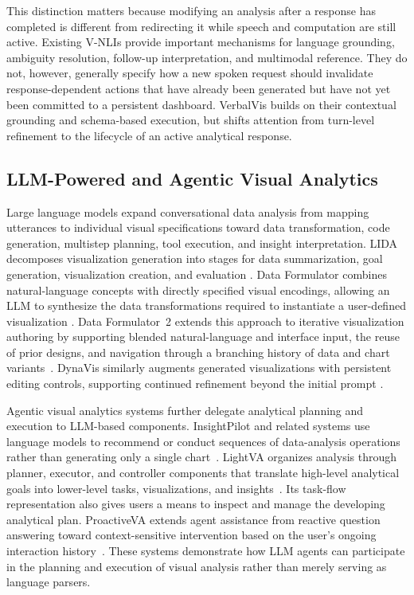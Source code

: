 \documentclass[journal]{IEEEtran}
\begin{document}
This distinction matters because modifying an analysis after a response has
completed is different from redirecting it while speech and computation are
still active. Existing V-NLIs provide important mechanisms for language
grounding, ambiguity resolution, follow-up interpretation, and multimodal
reference. They do not, however, generally specify how a new spoken request
should invalidate response-dependent actions that have already been generated
but have not yet been committed to a persistent dashboard. VerbalVis builds on
their contextual grounding and schema-based execution, but shifts attention
from turn-level refinement to the lifecycle of an active analytical response.

\subsection{LLM-Powered and Agentic Visual Analytics}
\label{sec:rw-agentic}

Large language models expand conversational data analysis from mapping
utterances to individual visual specifications toward data transformation,
code generation, multistep planning, tool execution, and insight
interpretation. LIDA decomposes visualization generation into stages for data
summarization, goal generation, visualization creation, and evaluation
\cite{dibia2023lida}. Data Formulator combines natural-language concepts with
directly specified visual encodings, allowing an LLM to synthesize the data
transformations required to instantiate a user-defined visualization
\cite{wang2024dataformulator}. Data Formulator~2 extends this approach to
iterative visualization authoring by supporting blended natural-language and
interface input, the reuse of prior designs, and navigation through a branching
history of data and chart variants~\cite{wang2024dataformulator2}. DynaVis
similarly augments generated visualizations with persistent editing controls,
supporting continued refinement beyond the initial prompt
\cite{vaithilingam2024dynavis}.

Agentic visual analytics systems further delegate analytical planning and
execution to LLM-based components. InsightPilot and related systems use
language models to recommend or conduct sequences of data-analysis operations
rather than generating only a single chart~\cite{ma2023insightpilot}. LightVA
organizes analysis through planner, executor, and controller components that
translate high-level analytical goals into lower-level tasks, visualizations,
and insights~\cite{zhao2024lightva}. Its task-flow representation also gives
users a means to inspect and manage the developing analytical plan.
ProactiveVA extends agent assistance from reactive question answering toward
context-sensitive intervention based on the user's ongoing interaction
history~\cite{zhao2025proactiveva}. These systems demonstrate how LLM agents
can participate in the planning and execution of visual analysis rather than
merely serving as language parsers.
\end{document}
